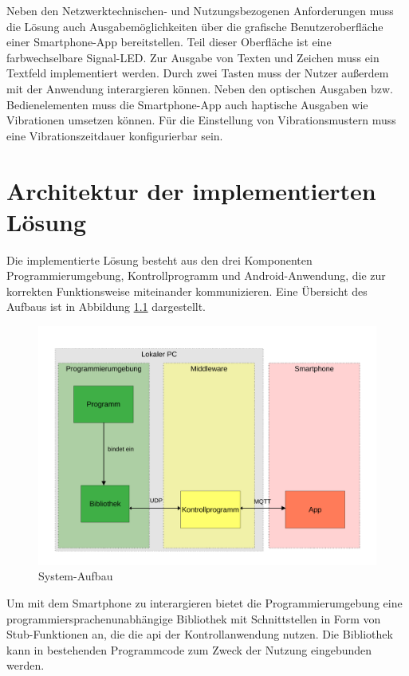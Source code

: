 \documentclass[11pt,a4paper]{report}
\begin{document}
Neben den Netzwerktechnischen- und Nutzungsbezogenen Anforderungen muss die Lösung auch Ausgabemöglichkeiten über die grafische Benutzeroberfläche einer Smartphone-App bereitstellen.
Teil dieser Oberfläche ist eine farbwechselbare Signal-LED.
Zur Ausgabe von Texten und Zeichen muss ein Textfeld implementiert werden.
Durch zwei Tasten muss der Nutzer außerdem mit der Anwendung interargieren können.
Neben den optischen Ausgaben bzw. Bedienelementen muss die Smartphone-App auch haptische Ausgaben wie Vibrationen umsetzen können.
Für die Einstellung von Vibrationsmustern muss eine Vibrationszeitdauer konfigurierbar sein.

\chapter{Architektur der implementierten Lösung} \label{chap:architektur}
Die implementierte Lösung besteht aus den drei Komponenten Programmierumgebung, Kontrollprogramm und Android-Anwendung, die zur korrekten Funktionsweise miteinander kommunizieren.
Eine Übersicht des Aufbaus ist in Abbildung \ref{fig:design} dargestellt.
\begin{figure}[htbp]
\centering
\includegraphics[width=\textwidth]{images/framework.pdf}
\caption{System-Aufbau}
\label{fig:design}
\end{figure}
Um mit dem Smartphone zu interargieren bietet die Programmierumgebung eine programmiersprachenunabhängige Bibliothek mit Schnittstellen in Form von Stub-Funktionen an, die die \acrshort{api} der Kontrollanwendung nutzen.
Die Bibliothek kann in bestehenden Programmcode zum Zweck der Nutzung eingebunden werden.
\end{document}
